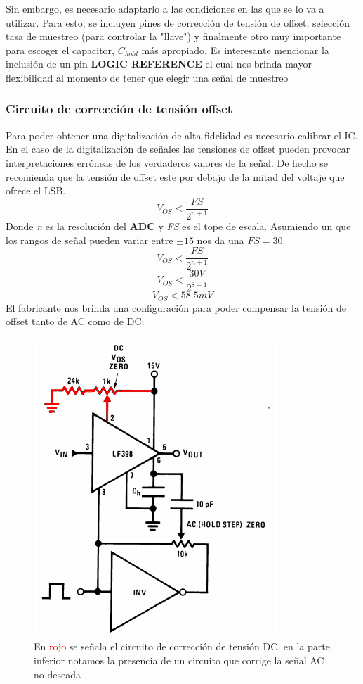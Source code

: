  Sin embargo, es necesario adaptarlo a las condiciones en las que se lo va a utilizar. Para esto, se incluyen pines de corrección de tensión de offset, selección tasa de muestreo (para controlar la "llave") y finalmente otro muy importante para escoger el capacitor, $C_{hold}$ más apropiado.
 Es interesante mencionar la inclusión de un pin \textbf{LOGIC REFERENCE} el cual nos brinda mayor flexibilidad al momento de tener que elegir una señal de muestreo
 \subsubsection{Circuito de corrección de tensión offset}
 Para poder obtener una digitalización de alta fidelidad es necesario calibrar el IC. En el caso de la digitalización de señales las tensiones de offset pueden provocar interpretaciones erróneas de los verdaderos valores de la señal. De hecho se recomienda que la tensión de offset este por debajo de la mitad del voltaje que ofrece el LSB.
 $$
 V_{OS} < \frac{FS}{2^{n+1}} 
 $$
Donde \textit{n }es la resolución del \textbf{ADC}
y \textit{FS} es el tope de escala.
Asumiendo un que los rangos de señal pueden variar entre $\pm15$ nos da una $FS=30$.
$$V_{OS}<\frac{FS}{2^{n+1}}$$
$$V_{OS}<\frac{30V}{2^{8+1}}$$
$$V_{OS}<58.5mV$$
El fabricante nos brinda una configuración para poder compensar la tensión de offset tanto de AC como de DC:
\begin{figure}[H]
	\centering
	\includegraphics[scale=0.6]{ImagenesEjercicio4/DCcolorized}
	\caption{En \textcolor{red}{rojo} se señala el circuito de corrección de tensión DC, en la parte inferior notamos la presencia de un circuito que corrige la señal AC no deseada}
	\label{fig:dccolorized}
\end{figure}
